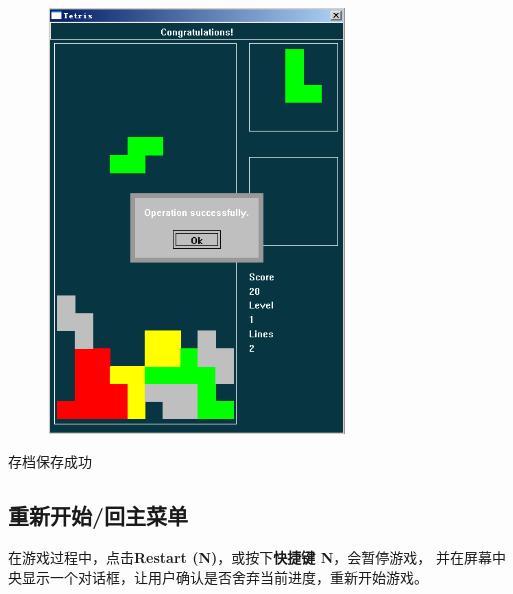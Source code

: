 \documentclass{style/ucasproposal}
\begin{document}
\begin{center}
\begin{figure}[H]
\center
    \includegraphics[width=0.7\textwidth]{./img/manual/5-save-or-load-success.png}
\end{figure}
存档保存成功
\end{center}

\subsection{重新开始/回主菜单}
在游戏过程中，点击\textbf{Restart (N)}，或按下\textbf{快捷键 N}，会暂停游戏，
并在屏幕中央显示一个对话框，让用户确认是否舍弃当前进度，重新开始游戏。
\end{document}
